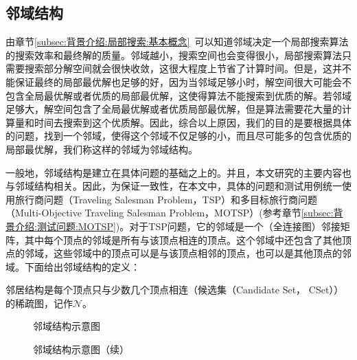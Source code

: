 \subsection{邻域结构}
\label{subsec:背景介绍:局部搜索:邻域结构}
由章节\ref{subsec:背景介绍:局部搜索:基本概念}~可以知道邻域决定一个局部搜索算法的搜索效率和最终解的质量。邻域越小，搜索空间也会变得很小，局部搜索算法只需要搜索部分解空间就会很快收敛，这很大程度上节省了计算时间。但是，这并不能保证最终的局部最优解也足够的好，因为当邻域足够小时，解空间很大可能会不包含全局最优解或者优质的局部最优解，这使得算法不能搜索到优质的解。若邻域足够大，解空间包含了全局最优解或者优质局部最优解，但是算法需要花大量的计算量和时间去搜索到这个优质解。因此，综合以上原因，我们的目的是要根据具体的问题，找到一个邻域，使得这个邻域不仅足够的小，而且尽可能多的包含优质的局部最优解，我们称这样的邻域为邻域结构。
\par
一般地，邻域结构是建立在具体问题的基础之上的。并且，本文研究的主要内容也与邻域结构相关。因此，为保证一致性，在本文中，具体的问题和测试用例统一使用旅行商问题（Traveling Salesman Problem，TSP）和多目标旅行商问题（Multi-Objective Traveling Salesman Problem，MOTSP）(参考章节\ref{subsec:背景介绍:测试问题:MOTSP})。对于TSP问题，它的邻域是一个（全连接图）邻接矩阵，其中每个顶点的邻域是所有与该顶点相连的顶点。这个邻域中还包含了其他顶点的邻域，这些邻域中的顶点可以是与该顶点相邻的顶点，也可以是其他顶点的邻域。下面给出邻域结构的定义：
\begin{definition}
    \label{def:邻域结构}
    邻居结构是每个顶点只与少数几个顶点相连（候选集（Candidate Set， CSet））的稀疏图，记作$\mathcal{N}$。
\end{definition}
\begin{figure}[htb]
    \caption[邻域结构示意图]{邻域结构示意图}
    \label{fig:邻域结构示意图}
\end{figure}
\begin{figure}[htb]
    \ContinuedFloat
    \caption[]{邻域结构示意图（续）}
\end{figure}
